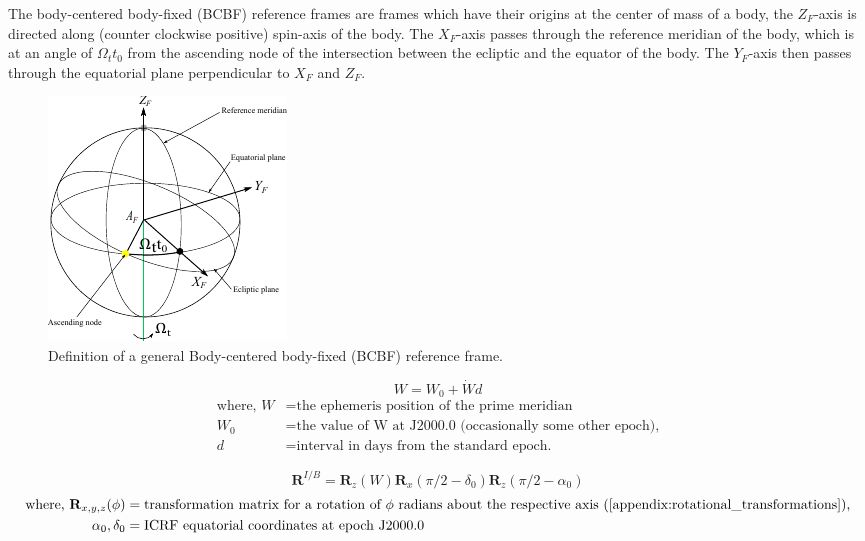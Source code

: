 The body-centered body-fixed (BCBF) reference frames are frames which have their
origins at the center of mass of a body, the $Z_F$-axis is directed along
(counter clockwise positive) spin-axis of the body. The $X_F$-axis passes
through the reference meridian of the body, which is at an angle of
$\Omega_t{t_0}$ from the ascending node of the intersection between the ecliptic
and the equator of the body. The $Y_F$-axis then passes through the equatorial
plane perpendicular to $X_F$ and $Z_F$.

\begin{figure}[!htp]
    \centering
    \includegraphics[width=0.35\linewidth]{graphics/bcbf.pdf}
    \caption{
        Definition of a general Body-centered body-fixed (BCBF) reference frame.
    }
    \label{fig:bci}
\end{figure}


\begin{equation}
    W = W_0 + \dot{W}d
    \label{eq:ephem_prime_meridian}
\end{equation}
\begin{equation*}
    \begin{aligned}
        \textrm{where, }
        W &= \textrm{the ephemeris position of the prime meridian} \\
        W_0 &= \textrm{the value of W at J2000.0 (occasionally some other epoch),} \\
        d &= \textrm{interval in days from the standard epoch.}
    \end{aligned}
\end{equation*}

\begin{equation}
    \mathbf{R}^{I/B}=\mathbf{R}_z(W)\mathbf{R}_x(\pi/2-\delta_0)\mathbf{R}_z(\pi/2-\alpha_0)
    \label{eq:bci_transformation}
\end{equation}
\begin{equation*}
    \begin{aligned}
        \textrm{where, }
        \mathbf{R}_{x,y,z}(\phi) &= \textrm{transformation matrix for a rotation of $\phi$ radians about the respective axis (\autoref{appendix:rotational_transformations}),}\\
        \alpha_0, \delta_0 &= \textrm{ICRF equatorial coordinates at epoch J2000.0} \\
    \end{aligned}
\end{equation*}


